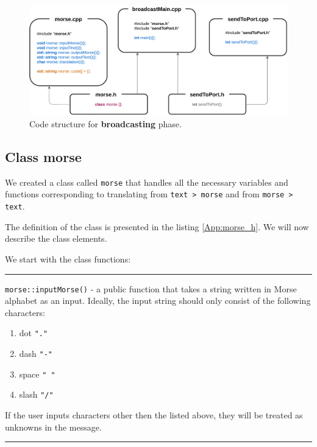 \documentclass[12pt]{report}
\begin{document}
\begin{figure}[H]
\centering\includegraphics[scale=0.12]{bCodeStructure}
\caption{Code structure for \textbf{broadcasting} phase.}				
\label{fig:br_code}
\end{figure}




\subsection{Class morse}

We created a class called \verb|morse| that handles all the necessary variables and functions corresponding to translating from \verb|text > morse| and from \verb|morse > text|.

The definition of the class is presented in the listing \ref{App:morse_h}. We will now describe the class elements.

We start with the class functions:

\rule{\textwidth}{0.5pt}

\verb|morse::inputMorse()| - a public function that takes a string written in Morse alphabet as an input. Ideally, the input string should only consist of the following characters:

\begin{enumerate}
\item dot \verb|"."|

\item dash \verb|"-"|

\item space \verb|" "|

\item slash \verb|"/"|
\end{enumerate}

If the user inputs characters other then the listed above, they will be treated as unknowns in the message.

\rule{\textwidth}{0.5pt}
\end{document}
